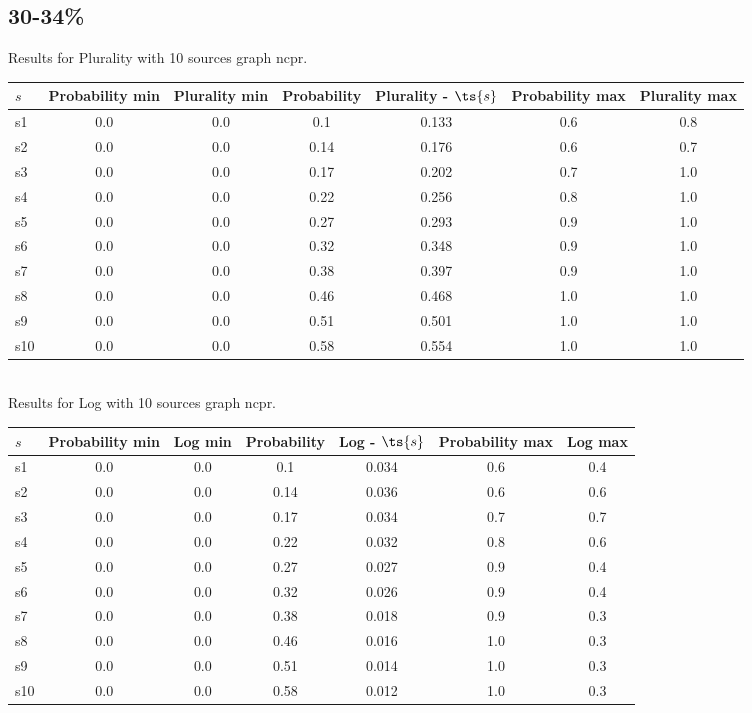 \documentclass{article}
\begin{document}
\newpage

\subsection{30-34\%}

\noindent Results for Plurality with 10 sources graph ncpr.

\noindent\begin{tabular}{|l|c|c|c|c|c|c|}
\hline
$s$& Probability min & Plurality min & Probability & Plurality - $\ts{s}$ & Probability max & Plurality max\\
\hline
s1 &0.0 & 0.0 & 0.1 & 0.133 & 0.6 & 0.8\\
\hline
s2 &0.0 & 0.0 & 0.14 & 0.176 & 0.6 & 0.7\\
\hline
s3 &0.0 & 0.0 & 0.17 & 0.202 & 0.7 & 1.0\\
\hline
s4 &0.0 & 0.0 & 0.22 & 0.256 & 0.8 & 1.0\\
\hline
s5 &0.0 & 0.0 & 0.27 & 0.293 & 0.9 & 1.0\\
\hline
s6 &0.0 & 0.0 & 0.32 & 0.348 & 0.9 & 1.0\\
\hline
s7 &0.0 & 0.0 & 0.38 & 0.397 & 0.9 & 1.0\\
\hline
s8 &0.0 & 0.0 & 0.46 & 0.468 & 1.0 & 1.0\\
\hline
s9 &0.0 & 0.0 & 0.51 & 0.501 & 1.0 & 1.0\\
\hline
s10 &0.0 & 0.0 & 0.58 & 0.554 & 1.0 & 1.0\\
\hline
\end{tabular}\\

\noindent Results for Log with 10 sources graph ncpr.

\noindent\begin{tabular}{|l|c|c|c|c|c|c|}
\hline
$s$& Probability min & Log min & Probability & Log - $\ts{s}$ & Probability max & Log max\\
\hline
s1 &0.0 & 0.0 & 0.1 & 0.034 & 0.6 & 0.4\\
\hline
s2 &0.0 & 0.0 & 0.14 & 0.036 & 0.6 & 0.6\\
\hline
s3 &0.0 & 0.0 & 0.17 & 0.034 & 0.7 & 0.7\\
\hline
s4 &0.0 & 0.0 & 0.22 & 0.032 & 0.8 & 0.6\\
\hline
s5 &0.0 & 0.0 & 0.27 & 0.027 & 0.9 & 0.4\\
\hline
s6 &0.0 & 0.0 & 0.32 & 0.026 & 0.9 & 0.4\\
\hline
s7 &0.0 & 0.0 & 0.38 & 0.018 & 0.9 & 0.3\\
\hline
s8 &0.0 & 0.0 & 0.46 & 0.016 & 1.0 & 0.3\\
\hline
s9 &0.0 & 0.0 & 0.51 & 0.014 & 1.0 & 0.3\\
\hline
s10 &0.0 & 0.0 & 0.58 & 0.012 & 1.0 & 0.3\\
\hline
\end{tabular}\\
\end{document}
